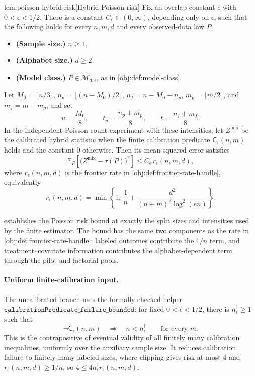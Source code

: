 \begin{lemmav}{lem:poisson-hybrid-risk}[Hybrid Poisson risk]
Fix an overlap constant \(\epsilon\) with \(0<\epsilon<1/2\).  There is a constant \(C_\epsilon\in(0,\infty)\), depending only on \(\epsilon\), such that the following holds for every \(n,m,d\) and every observed-data law \(P\):
\begin{itemize}
\item \textbf{(Sample size.)} \(n\ge 1\).
\item \textbf{(Alphabet size.)} \(d\ge 2\).
\item \textbf{(Model class.)} \(P\in\mathcal M_{d,\epsilon}\), as in \cref{obj:def:model-class}.
\end{itemize}
Let \(M_0=\lfloor n/3\rfloor\), \(n_p=\lfloor(n-M_0)/2\rfloor\), \(n_f=n-M_0-n_p\), \(m_p=\lfloor m/2\rfloor\), and \(m_f=m-m_p\), and set
\[
u=\frac{M_0}{8},
\qquad
t_p=\frac{n_p+m_p}{8},
\qquad
t=\frac{n_f+m_f}{8}.
\]
In the independent Poisson count experiment with these intensities, let \(Z^{\mathrm{mix}}\) be the calibrated hybrid statistic when the finite calibration predicate \(\mathsf C_\epsilon(n,m)\) holds and the constant \(0\) otherwise.  Then its mean-squared error satisfies
\[
\mathbb E_P\!\left[\bigl(Z^{\mathrm{mix}}-\tau(P)\bigr)^2\right]
\le
C_\epsilon\, r_\epsilon(n,m,d),
\]
where \(r_\epsilon(n,m,d)\) is the frontier rate in \cref{obj:def:frontier-rate-handle}, equivalently
\[
r_\epsilon(n,m,d)
=
\min\!\left\{
1,\,
\frac1n+
\frac{d^2}{(n+m)^2\log^2(en)}
\right\}.
\]
\end{lemmav}

 establishes the Poisson risk bound at exactly the split sizes and intensities used by the finite estimator. The bound has the same two components as the rate in \cref{obj:def:frontier-rate-handle}: labeled outcomes contribute the \(1/n\) term, and treatment--covariate information contributes the alphabet-dependent term through the pilot and factorial pools.

\paragraph{Uniform finite-calibration input.}
The uncalibrated branch uses the formally checked helper
\(\texttt{calibrationPredicate\_failure\_bounded}\): for fixed \(0<\epsilon<1/2\), there is \(n_\epsilon^\dagger\ge1\) such that
\[
\neg\mathsf C_\epsilon(n,m)\quad\Longrightarrow\quad n<n_\epsilon^\dagger
\qquad\text{for every }m.
\]
This is the contrapositive of eventual validity of all finitely many calibration inequalities, uniformly over the auxiliary sample size. It reduces calibration failure to finitely many labeled sizes, where clipping gives risk at most \(4\) and \(r_\epsilon(n,m,d)\ge1/n\), so \(4\le4n_\epsilon^\dagger r_\epsilon(n,m,d)\).

